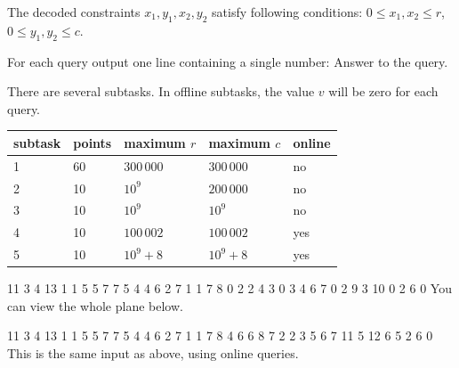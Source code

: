 The decoded constraints $x_1, y_1, x_2, y_2$ satisfy following conditions:
$0 \leq x_1, x_2 \leq r$, $0 \leq y_1, y_2 \leq c$. 


For each query output one line containing a single number: Answer to the query.


There are several subtasks. In offline subtasks, the value $v$ will be zero for each query. 

\bigskip

\centering
\begin{tabular}{|l|l|l|l|l|}
\hline
subtask & points & maximum $r$  & maximum $c$   & online    \\ \hline
1       & 60     & $300\,000$   & $300\,000$    & no        \\ \hline
2       & 10     & $10^9$       & $200\,000$    & no        \\ \hline
3       & 10     & $10^9$       & $10^9$        & no        \\ \hline
4       & 10     & $100\,002$   & $100\,002$    & yes       \\ \hline
5       & 10     & $10^9 + 8$   & $10^9 + 8$    & yes       \\ \hline
\end{tabular}



 11 3 4 13
1 1 5 5
7 7 5 4
4 6 2 7
1 1 7 8 0
2 2 4 3 0
3 4 6 7 0
2 9 3 10 0
2
6
0
\sampleCOMMENT
You can view the whole plane below.
\sampleEND
{}

 11 3 4 13
1 1 5 5
7 7 5 4
4 6 2 7
1 1 7 8 4
6 6 8 7 2
2 3 5 6 7
11 5 12 6 5
2
6
0
\sampleCOMMENT
This is the same input as above, using online queries.
\sampleEND

